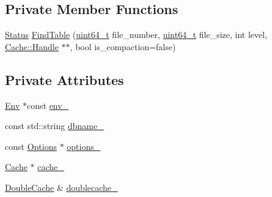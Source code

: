 \subsection*{Private Member Functions}
\begin{DoxyCompactItemize}
\item 
\hyperlink{classleveldb_1_1_status}{Status} \hyperlink{classleveldb_1_1_table_cache_aa0cd447e821b7d4e39e9e5bb8af96537}{Find\+Table} (\hyperlink{stdint_8h_aaa5d1cd013383c889537491c3cfd9aad}{uint64\+\_\+t} file\+\_\+number, \hyperlink{stdint_8h_aaa5d1cd013383c889537491c3cfd9aad}{uint64\+\_\+t} file\+\_\+size, int level, \hyperlink{structleveldb_1_1_cache_1_1_handle}{Cache\+::\+Handle} $\ast$$\ast$, bool is\+\_\+compaction=false)
\end{DoxyCompactItemize}
\subsection*{Private Attributes}
\begin{DoxyCompactItemize}
\item 
\hyperlink{classleveldb_1_1_env}{Env} $\ast$const \hyperlink{classleveldb_1_1_table_cache_af5d435597adb6dccac9bd05958f24afb}{env\+\_\+}
\item 
const std\+::string \hyperlink{classleveldb_1_1_table_cache_adce6e6a7cfbf8822e5035ca44306c77b}{dbname\+\_\+}
\item 
const \hyperlink{structleveldb_1_1_options}{Options} $\ast$ \hyperlink{classleveldb_1_1_table_cache_ad24157b076d23fc18fe90d530241fd23}{options\+\_\+}
\item 
\hyperlink{classleveldb_1_1_cache}{Cache} $\ast$ \hyperlink{classleveldb_1_1_table_cache_a27afd704a6aa631d57c684e0b8c548c6}{cache\+\_\+}
\item 
\hyperlink{classleveldb_1_1_double_cache}{Double\+Cache} \& \hyperlink{classleveldb_1_1_table_cache_a603ad92365e50922093c1e5783e9bd50}{doublecache\+\_\+}
\end{DoxyCompactItemize}



